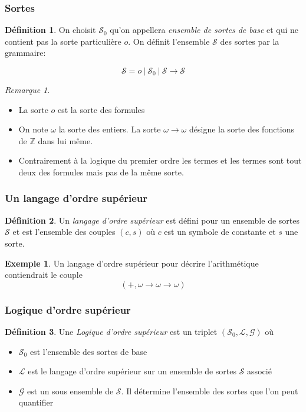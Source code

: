 \documentclass[11pt,a4paper]{beamer}
\theoremstyle{plain}
\theoremstyle{definition}
\newtheorem{defn}{Définition}[section]
\newtheorem{exmp}{Exemple}[section]
\theoremstyle{remark}
\newtheorem*{rem}{Remarque}
\begin{document}
\begin{frame}
\frametitle{Sortes}
\begin{defn}
On choisit $\mathcal{S}_0$ qu'on appellera \textit{ensemble de sortes de base} et qui ne contient pas la sorte particulière $o$. On définit l'ensemble $\mathcal{S}$ des sortes par la grammaire:

\[ \mathcal{S} = o~|~\mathcal{S}_0~|~\mathcal{S}\rightarrow\mathcal{S} \]
\end{defn}

\begin{rem}
\begin{itemize}
\item La sorte $o$ est la sorte des formules
\item On note $\omega$ la sorte des entiers. La sorte $\omega \rightarrow \omega$ désigne la sorte des fonctions de $\mathbb{Z}$ dans lui même.
\item Contrairement à la logique du premier ordre les termes et les termes sont tout deux des formules mais pas de la même sorte.
\end{itemize}
\end{rem}
\end{frame}

\begin{frame}
\frametitle{Un langage d'ordre supérieur}
\begin{defn}
Un \textit{langage d'ordre supérieur} est défini pour un ensemble de sortes $\mathcal{S}$ et est l'ensemble des couples $(c,s)$ où $c$ est un symbole de constante et $s$ une sorte.
\end{defn}

\begin{exmp}
Un langage d'ordre supérieur pour décrire l'arithmétique contiendrait le couple
\[ \left(+, \omega \rightarrow \omega \rightarrow \omega\right) \]
\end{exmp}
\end{frame}

\begin{frame}
\frametitle{Logique d'ordre supérieur}
\begin{defn}
Une \textit{Logique d'ordre supérieur} est un triplet $(\mathcal{S}_0, \mathcal{L}, \mathcal{G})$ où
\begin{itemize}
\item $\mathcal{S}_0$ est l'ensemble des sortes de base
\item $\mathcal{L}$ est le langage d'ordre supérieur sur un ensemble de sortes $\mathcal{S}$ associé
\item $\mathcal{G}$ est un sous ensemble de $\mathcal{S}$. Il détermine l'ensemble des sortes que l'on peut quantifier
\end{itemize}
\end{defn}
\end{frame}
\end{document}
